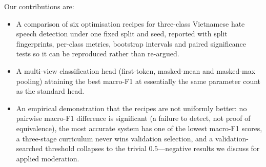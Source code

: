 Our contributions are:

\begin{itemize}
  \item A comparison of six optimisation recipes for three-class Vietnamese hate
        speech detection under one fixed split and seed, reported with split
        fingerprints, per-class metrics, bootstrap intervals and paired significance
        tests so it can be reproduced rather than re-argued.
  \item A multi-view classification head (first-token, masked-mean and masked-max
        pooling) attaining the best macro-F1 at essentially the same parameter
        count as the standard head.
  \item An empirical demonstration that the recipes are not uniformly better: no
        pairwise macro-F1 difference is significant (a failure to detect, not
        proof of equivalence), the most accurate system has one of the lowest
        macro-F1 scores, a three-stage curriculum never wins validation
        selection, and a validation-searched threshold collapses to the trivial
        $0.5$---negative results we discuss for applied moderation.
\end{itemize}
